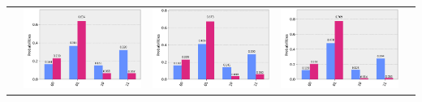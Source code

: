 \documentclass[11pt]{article}
\begin{document}
\begin{table}[h!]
\begin{tabular}{| c | c | c | c | c | }
\begin{minipage}{.215\textwidth}
      \end{minipage}&
      \begin{minipage}{.215\textwidth}
        \includegraphics[width=\linewidth]{img/qecc3_Y01.png}
      \end{minipage}
      &\begin{minipage}{.215\textwidth}
        \includegraphics[width=\linewidth]{img/qecc3_Z01.png}
      \end{minipage}
      &\begin{minipage}{.215\textwidth}
        \includegraphics[width=\linewidth]{img/qecc3_I01.png}

\end{minipage}
\end{tabular}
\end{table}
\end{document}
